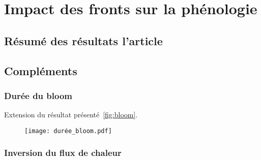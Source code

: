 
\chapter{Impact des fronts sur la phénologie}
\addChpLof
\label{chp:res-phenologie}
\graphicspath{{resources/res_phénologie}}

\minitoc%
\clearpage

\section{Résumé des résultats l'article}
\label{sec:resume-res-phenologie}

\section{Compléments}
\label{sec:complements-phenologie}

\subsection{Durée du bloom}
\label{sec:duree-bloom}

Extension du résultat présenté~\cref{fig:bloom}.

\begin{figure}
  \centering
  \texttt{[image: durée\_bloom.pdf]}
  \label{fig:duree-bloom}
\end{figure}

\subsection{Inversion du flux de chaleur}
\label{sec:flux-chaleur}
